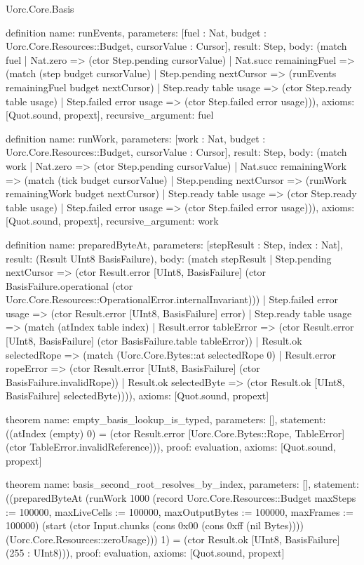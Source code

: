 \begin{lexlean}{Uorc.Core.Basis}
\begin{semanticmodule}
definition{
  name: runEvents,
  parameters: [fuel : Nat, budget : Uorc.Core.Resources::Budget, cursorValue : Cursor],
  result: Step,
  body: (match fuel
    | Nat.zero => (ctor Step.pending cursorValue)
    | Nat.succ remainingFuel => (match (step budget cursorValue)
      | Step.pending nextCursor => (runEvents remainingFuel budget nextCursor)
      | Step.ready table usage => (ctor Step.ready table usage)
      | Step.failed error usage => (ctor Step.failed error usage))),
  axioms: [Quot.sound, propext],
  recursive_argument: fuel
}

definition{
  name: runWork,
  parameters: [work : Nat, budget : Uorc.Core.Resources::Budget, cursorValue : Cursor],
  result: Step,
  body: (match work
    | Nat.zero => (ctor Step.pending cursorValue)
    | Nat.succ remainingWork => (match (tick budget cursorValue)
      | Step.pending nextCursor => (runWork remainingWork budget nextCursor)
      | Step.ready table usage => (ctor Step.ready table usage)
      | Step.failed error usage => (ctor Step.failed error usage))),
  axioms: [Quot.sound, propext],
  recursive_argument: work
}

definition{
  name: preparedByteAt,
  parameters: [stepResult : Step, index : Nat],
  result: (Result UInt8 BasisFailure),
  body: (match stepResult
    | Step.pending nextCursor => (ctor Result.error [UInt8, BasisFailure] (ctor BasisFailure.operational (ctor Uorc.Core.Resources::OperationalError.internalInvariant)))
    | Step.failed error usage => (ctor Result.error [UInt8, BasisFailure] error)
    | Step.ready table usage => (match (atIndex table index)
      | Result.error tableError => (ctor Result.error [UInt8, BasisFailure] (ctor BasisFailure.table tableError))
      | Result.ok selectedRope => (match (Uorc.Core.Bytes::at selectedRope 0)
        | Result.error ropeError => (ctor Result.error [UInt8, BasisFailure] (ctor BasisFailure.invalidRope))
        | Result.ok selectedByte => (ctor Result.ok [UInt8, BasisFailure] selectedByte)))),
  axioms: [Quot.sound, propext]
}

theorem{
  name: empty_basis_lookup_is_typed,
  parameters: [],
  statement: ((atIndex (empty) 0) = (ctor Result.error [Uorc.Core.Bytes::Rope, TableError] (ctor TableError.invalidReference))),
  proof: evaluation{},
  axioms: [Quot.sound, propext]
}

theorem{
  name: basis_second_root_resolves_by_index,
  parameters: [],
  statement: ((preparedByteAt (runWork 1000 (record Uorc.Core.Resources::Budget {maxSteps := 100000, maxLiveCells := 100000, maxOutputBytes := 100000, maxFrames := 100000}) (start (ctor Input.chunks (cons 0x00 (cons 0xff (nil Bytes)))) (Uorc.Core.Resources::zeroUsage))) 1) = (ctor Result.ok [UInt8, BasisFailure] (255 : UInt8))),
  proof: evaluation{},
  axioms: [Quot.sound, propext]
}


\end{semanticmodule}
\end{lexlean}
